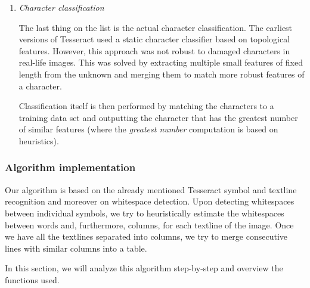 \begin{enumerate}
    \item \emph{Character classification}
    
    The last thing on the list is the actual character classification. The earliest versions of Tesseract used a static character classifier based on topological features. However, this approach was not robust to damaged characters in real-life images. This was solved by extracting multiple small features of fixed length from the unknown and merging them to match more robust features of a character.
    
    Classification itself is then performed by matching the characters to a training data set and outputting the character that has the greatest number of similar features (where the \emph{greatest number} computation is based on heuristics).
    
\end{enumerate}


\subsubsection{Algorithm implementation}

Our algorithm is based on the already mentioned Tesseract symbol and textline recognition and moreover on whitespace detection. Upon detecting whitespaces between individual symbols, we try to heuristically estimate the whitespaces between words and, furthermore, columns, for each textline of the image. Once we have all the textlines separated into columns, we try to merge consecutive lines with similar columns into a table.  

In this section, we will analyze this algorithm step-by-step and overview the functions used.

